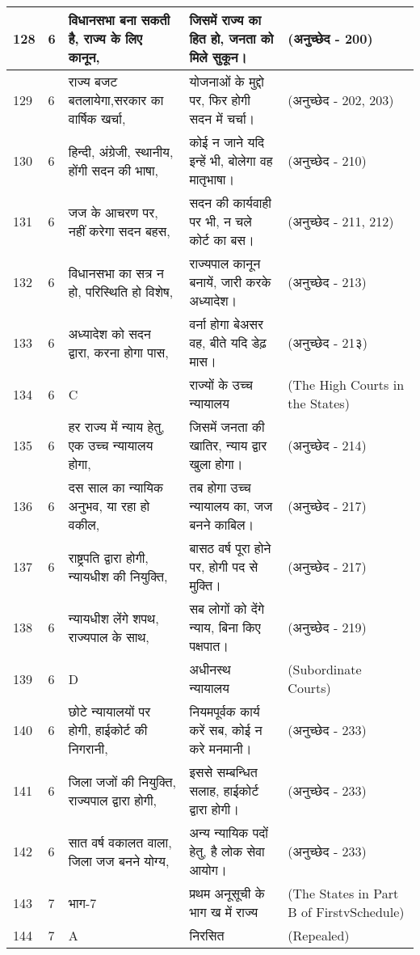 \begin{longtable}{|l|l|l|l|l|}
128 & 6 & विधानसभा बना सकती है, राज्य के लिए कानून, & जिसमें राज्य का हित हो, जनता को मिले सुकून। & (अनुच्छेद - 200) \\ \hline 
129 & 6 & राज्य बजट बतलायेगा,सरकार का वार्षिक खर्चा, & योजनाओं के मुद्दो पर, फिर होगी सदन में चर्चा। & (अनुच्छेद - 202, 203) \\ \hline 
130 & 6 & हिन्दी, अंग्रेजी, स्थानीय, होंगी सदन की भाषा, & कोई न जाने यदि इन्हें भी, बोलेगा वह मातृभाषा। & (अनुच्छेद - 210) \\ \hline 
131 & 6 & जज के आचरण पर, नहीं करेगा सदन बहस, & सदन की कार्यवाही पर भी, न चले कोर्ट का बस। & (अनुच्छेद - 211, 212) \\ \hline 
132 & 6 & विधानसभा का सत्र न हो, परिस्थिति हो विशेष, & राज्यपाल कानून बनायें, जारी करके अध्यादेश। & (अनुच्छेद - 213) \\ \hline 
133 & 6 & अध्यादेश को सदन द्वारा, करना होगा पास, & वर्ना होगा बेअसर वह, बीते यदि डेढ़ मास। & (अनुच्छेद - 21३) \\ \hline 
134 & 6 & C & राज्यों के उच्च न्यायालय & (The High Courts in the States) \\ \hline 
135 & 6 & हर राज्य में न्याय हेतु, एक उच्च न्यायालय होगा, & जिसमें जनता की खातिर, न्याय द्वार खुला होगा। & (अनुच्छेद - 214) \\ \hline 
136 & 6 & दस साल का न्यायिक अनुभव, या रहा हो वकील, & तब होगा उच्च न्यायालय का, जज बनने काबिल। & (अनुच्छेद - 217) \\ \hline 
137 & 6 & राष्ट्रपति द्वारा होगी, न्यायधीश की नियुक्ति, & बासठ वर्ष पूरा होने पर, होगी पद से मुक्ति। & (अनुच्छेद - 217) \\ \hline 
138 & 6 & न्यायधीश लेंगे शपथ, राज्यपाल के साथ, & सब लोगों को देंगे न्याय, बिना किए पक्षपात। & (अनुच्छेद - 219) \\ \hline 
139 & 6 & D & अधीनस्थ न्यायालय & (Subordinate Courts) \\ \hline 
140 & 6 & छोटे न्यायालयों पर होगी, हाईकोर्ट की निगरानी, & नियमपूर्वक कार्य करें सब, कोई न करे मनमानी। & (अनुच्छेद - 233) \\ \hline 
141 & 6 & जिला जजों की नियुक्ति, राज्यपाल द्वारा होगी, & इससे सम्बन्धित सलाह, हाईकोर्ट द्वारा होगी। & (अनुच्छेद - 233) \\ \hline 
142 & 6 & सात वर्ष वकालत वाला, जिला जज बनने योग्य, & अन्य न्यायिक पदों हेतु, है लोक सेवा आयोग। & (अनुच्छेद - 233) \\ \hline 
143 & 7 & भाग-7 & प्रथम अनूसूची के भाग ख में राज्य & (The States in Part B of FirstvSchedule) \\ \hline 
144 & 7 & A & निरसित  & (Repealed) \\ \hline 

\end{longtable}
